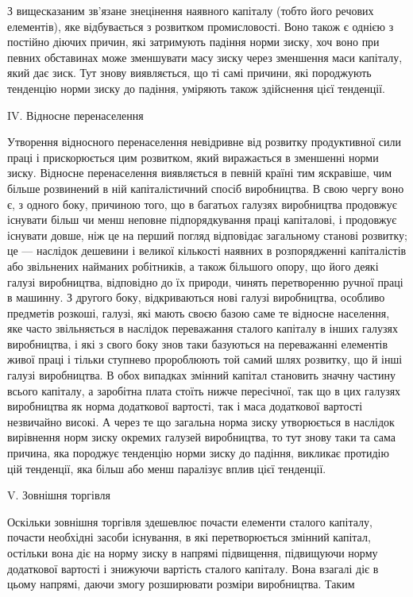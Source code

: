 З вищесказаним зв’язане знецінення наявного капіталу (тобто його речових елементів), яке
відбувається з розвитком промисловості. Воно також є однією з постійно діючих причин, які затримують
падіння норми зиску, хоч воно при певних обставинах може зменшувати масу зиску через зменшення маси
капіталу, який дає зиск. Тут знову виявляється, що ті самі причини, які породжують тенденцію норми
зиску до падіння, уміряють також здійснення цієї тенденції.

IV. Відносне перенаселення

Утворення відносного перенаселення невідривне від розвитку продуктивної сили праці і прискорюється
цим розвитком, який виражається в зменшенні норми зиску. Відносне перенаселення виявляється в певній
країні тим яскравіше, чим більше розвинений в ній капіталістичний спосіб виробництва. В свою чергу
воно є, з одного боку, причиною того, що в багатьох галузях виробництва продовжує існувати більш чи
менш неповне підпорядкування праці капіталові, і продовжує існувати довше, ніж це на перший погляд
відповідає загальному станові розвитку; це — наслідок дешевини і великої кількості наявних в
розпорядженні капіталістів або звільнених найманих робітників, а також більшого опору, що його деякі
галузі виробництва, відповідно до
їх природи, чинять перетворенню ручної праці в машинну. З другого боку, відкриваються нові галузі
виробництва, особливо предметів розкоші, галузі, які мають своєю базою саме те відносне населення,
яке часто звільняється в наслідок переважання сталого капіталу в інших галузях виробництва, і які з
свого боку знов таки базуються на переважанні елементів живої праці і тільки ступнево пророблюють
той самий шлях розвитку, що й інші галузі виробництва. В обох випадках змінний капітал становить
значну частину всього капіталу, а заробітна плата стоїть нижче пересічної, так що в цих галузях
виробництва як норма додаткової вартості, так і маса додаткової вартості незвичайно високі. А через
те що загальна норма зиску утворюється в наслідок вирівнення норм зиску окремих галузей виробництва,
то
тут знову таки та сама причина, яка породжує тенденцію норми зиску до падіння, викликає протидію цій
тенденції, яка більш або менш паралізує вплив цієї тенденції.

V. Зовнішня торгівля

Оскільки зовнішня торгівля здешевлює почасти елементи сталого капіталу, почасти необхідні засоби
існування, в які перетворюється змінний капітал, остільки вона діє на норму зиску в напрямі
підвищення, підвищуючи норму додаткової вартості і знижуючи вартість сталого капіталу. Вона взагалі
діє в цьому напрямі, даючи змогу розширювати розміри виробництва. Таким
\parbreak{}  %

